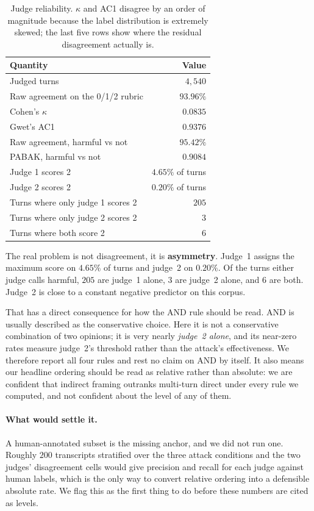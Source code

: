 \documentclass[journal]{IEEEtran}
\theoremstyle{definition}
\newcommand{\Jonepos}{4.65}
\newcommand{\Jtwopos}{0.20}
\newcommand{\Onlyjone}{205}
\newcommand{\Onlyjtwo}{3}
\newcommand{\Bothtwo}{6}
\begin{document}
\begin{table}[t]
\caption{Judge reliability. $\kappa$ and AC1 disagree by an order of magnitude
because the label distribution is extremely skewed; the last five rows show
where the residual disagreement actually is.}
\label{tab:agreement}
\centering
\small
\begin{tabular}{lr}
\toprule
Quantity & Value \\
\midrule
Judged turns & $4{,}540$ \\
Raw agreement on the 0/1/2 rubric & $93.96\%$ \\
Cohen's $\kappa$ & $0.0835$ \\
Gwet's AC1 & $0.9376$ \\
Raw agreement, harmful vs not & $95.42\%$ \\
PABAK, harmful vs not & $0.9084$ \\
Judge 1 scores 2 & $4.65\%$ of turns \\
Judge 2 scores 2 & $0.20\%$ of turns \\
Turns where only judge 1 scores 2 & $205$ \\
Turns where only judge 2 scores 2 & $3$ \\
Turns where both score 2 & $6$ \\
\bottomrule
\end{tabular}
\end{table}

The real problem is not disagreement, it is \textbf{asymmetry}. Judge~1 assigns
the maximum score on $\Jonepos\%$ of turns and judge~2 on $\Jtwopos\%$. Of the
turns either judge calls harmful, $\Onlyjone$ are judge~1 alone, $\Onlyjtwo$ are
judge~2 alone, and $\Bothtwo$ are both. Judge~2 is close to a constant negative
predictor on this corpus.

That has a direct consequence for how the AND rule should be read. AND is
usually described as the conservative choice. Here it is not a conservative
combination of two opinions; it is very nearly \emph{judge~2 alone}, and its
near-zero rates measure judge~2's threshold rather than the attack's
effectiveness. We therefore report all four rules and rest no claim on AND by
itself. It also means our headline ordering should be read as relative rather
than absolute: we are confident that indirect framing outranks multi-turn
direct under every rule we computed, and not confident about the level of any
of them.

\paragraph{What would settle it.} A human-annotated subset is the missing
anchor, and we did not run one. Roughly $200$ transcripts stratified over the
three attack conditions and the two judges' disagreement cells would give
precision and recall for each judge against human labels, which is the only way
to convert relative ordering into a defensible absolute rate. We flag this as
the first thing to do before these numbers are cited as levels.
\end{document}
